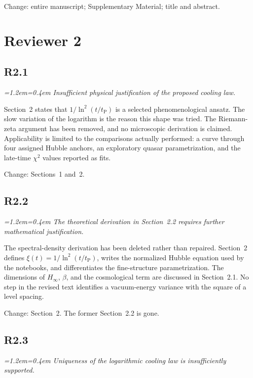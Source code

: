 \documentclass[11pt,a4paper]{article}
\newenvironment{review}{\par\color{revcolor}\itshape\leftskip=1.2em\rightskip=0.4em\noindent}{\par\leftskip=0pt\rightskip=0pt}
\begin{document}
Change: entire manuscript; Supplementary Material; title and abstract.

\section*{Reviewer 2}

\subsection*{R2.1}
\begin{review}
Insufficient physical justification of the proposed cooling law.
\end{review}

Section~2 states that $1/\ln^2(t/t_{\mathrm{P}})$ is a selected phenomenological ansatz.
The slow variation of the logarithm is the reason this shape was tried.
The Riemann-zeta argument has been removed, and no microscopic derivation is claimed.
Applicability is limited to the comparisons actually performed: a curve through four assigned Hubble anchors, an exploratory quasar parametrization, and the late-time $\chi^2$ values reported as fits.

Change: Sections~1 and~2.

\subsection*{R2.2}
\begin{review}
The theoretical derivation in Section~2.2 requires further mathematical justification.
\end{review}

The spectral-density derivation has been deleted rather than repaired.
Section~2 defines $\xi(t) = 1/\ln^2(t/t_{\mathrm{P}})$, writes the normalized Hubble equation used by the notebooks, and differentiates the fine-structure parametrization.
The dimensions of $H_\infty$, $\beta$, and the cosmological term are discussed in Section~2.1.
No step in the revised text identifies a vacuum-energy variance with the square of a level spacing.

Change: Section~2. The former Section~2.2 is gone.

\subsection*{R2.3}
\begin{review}
Uniqueness of the logarithmic cooling law is insufficiently supported.
\end{review}
\end{document}

